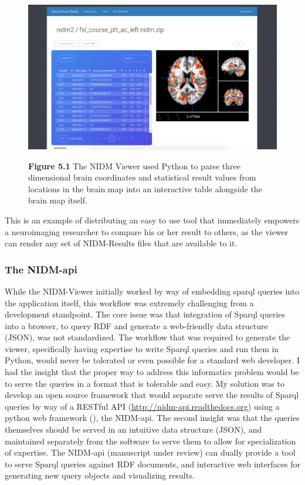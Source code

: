 \documentclass{report}
\begin{document}
\begin{figure}[h!]
\begin{center}
\includegraphics[width=15cm]{images/figure51.png}
\end{center}
 \textbf{\label{fig:51} Figure 5.1 }{ The NIDM Viewer used Python to parse three dimensional brain
coordinates and statistical result values from locations in the brain
map into an interactive table alongside the brain map itself.
}
\end{figure}

This is an example of distributing an easy to use tool that immediately
empowers a neuroimaging researcher to compare his or her result to
others, as the viewer can render any set of NIDM-Results files that are
available to it.

\subsubsection{The NIDM-api}

While the NIDM-Viewer initially worked by way of embedding sparql
queries into the application itself, this workflow was extremely
challenging from a development standpoint. The core issue was that
integration of Sparql queries into a browser, to query RDF and generate
a web-friendly data structure (JSON), was not standardized. The workflow
that was required to generate the viewer, specifically having expertise
to write Sparql queries and run them in Python, would never be tolerated
or even possible for a standard web developer. I had the insight that
the proper way to address this informatics problem would be to serve the
queries in a format that is tolerable and easy. My solution was to
develop an open source framework that would separate serve the results
of Sparql queries by way of a RESTful API
(\href{http://nidm-api.readthedocs.org}{http://nidm-api.readthedocs.org})
using a python web framework
(\cite{noauthor_undated-ia}),
the NIDM-api. The second insight was that the queries themselves should
be served in an intuitive data structure (JSON), and maintained
separately from the software to serve them to allow for specialization
of expertise. The NIDM-api (manuscript under review) can dually provide
a tool to serve Sparql queries against RDF documents, and interactive
web interfaces for generating new query objects and visualizing results.
\end{document}
